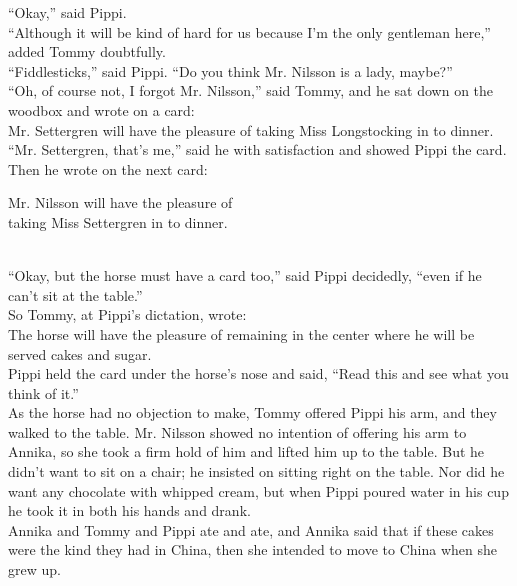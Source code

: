 \documentclass{standard}
\begin{document}
“Okay,” said Pippi.\\

“Although it will be kind of hard for us because I’m the only gentleman here,” added Tommy doubtfully.\\

“Fiddlesticks,” said Pippi. “Do you think Mr. Nilsson is a lady, maybe?”\\

“Oh, of course not, I forgot Mr. Nilsson,” said Tommy, and he sat down on the woodbox and wrote on a card:\\

Mr. Settergren will have the pleasure of taking Miss Longstocking in to dinner.\\

“Mr. Settergren, that’s me,” said he with satisfaction and showed Pippi the card. Then he wrote on the next card:\\

\begin{center}
Mr. Nilsson will have the pleasure of\\
taking Miss Settergren in to dinner.
\end{center}
\noindent \\

“Okay, but the horse must have a card too,” said Pippi decidedly, “even if he can’t sit at the table.”\\

So Tommy, at Pippi’s dictation, wrote:\\

The horse will have the pleasure of remaining in the center where he will be served cakes and sugar.\\

Pippi held the card under the horse’s nose and said, “Read this and see what you think of it.”\\

As the horse had no objection to make, Tommy offered Pippi his arm, and they walked to the table. Mr. Nilsson showed no intention of offering his arm to Annika, so she took a firm hold of him and lifted him up to the table. But he didn’t want to sit on a chair; he insisted on sitting right on the table. Nor did he want any chocolate with whipped cream, but when Pippi poured water in his cup he took it in both his hands and drank.\\

Annika and Tommy and Pippi ate and ate, and Annika said that if these cakes were the kind they had in China, then she intended to move to China when she grew up.\\
\end{document}
